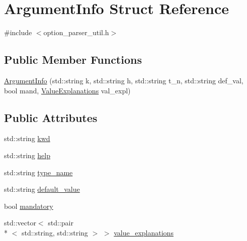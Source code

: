 \hypertarget{structArgumentInfo}{\section{Argument\-Info Struct Reference}
\label{structArgumentInfo}
}


{\ttfamily \#include $<$option\-\_\-parser\-\_\-util.\-h$>$}

\subsection*{Public Member Functions}
\begin{DoxyCompactItemize}
\item 
\hyperlink{structArgumentInfo_abc35049051758e30636fb9fb8a6c3531}{Argument\-Info} (std\-::string k, std\-::string h, std\-::string t\-\_\-n, std\-::string def\-\_\-val, bool mand, \hyperlink{option__parser__util_8h_a916a9983a28a9efe2c606860052d5fe0}{Value\-Explanations} val\-\_\-expl)
\end{DoxyCompactItemize}
\subsection*{Public Attributes}
\begin{DoxyCompactItemize}
\item 
std\-::string \hyperlink{structArgumentInfo_a3939ba50571353511e65445f7221ef7f}{kwd}
\item 
std\-::string \hyperlink{structArgumentInfo_addf894afc368f4443db54b6eb4a34780}{help}
\item 
std\-::string \hyperlink{structArgumentInfo_a7b2bc9ef5d0e990148bbac47f1af412b}{type\-\_\-name}
\item 
std\-::string \hyperlink{structArgumentInfo_ab52fb72ba449c72671adedcaed9f5869}{default\-\_\-value}
\item 
bool \hyperlink{structArgumentInfo_adda4b808e8743cd88fc051a580a0ea90}{mandatory}
\item 
std\-::vector$<$ std\-::pair\\*
$<$ std\-::string, std\-::string $>$ $>$ \hyperlink{structArgumentInfo_a7893d5f02921816d8e10a1db35a3fe0e}{value\-\_\-explanations}
\end{DoxyCompactItemize}


